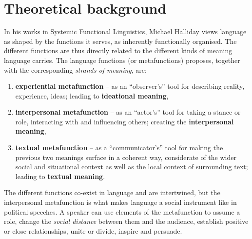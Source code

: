 \documentclass[11pt]{article}
\begin{document}
\section{Theoretical background}{
	In his works in Systemic Functional Linguistics, Michael Halliday views language as shaped by the functions it serves, as inherently functionally organised. The different functions are thus directly related to the different kinds of meaning language carries.
	The language functions (or metafunctions) \citet{Halliday1970IM} proposes, together with the corresponding \textit{strands of meaning}, are:
	\begin{enumerate}
		\item \textbf{experiential metafunction} -- as an ``observer's'' tool for describing reality, experience, ideas; leading to \textbf{ideational meaning},
		\item \textbf{interpersonal metafunction} -- as an ``actor's'' tool for taking a stance or role, interacting with and influencing others; creating the \textbf{interpersonal meaning},
		\item \textbf{textual metafunction} -- as a ``communicator's'' tool for making the previous two meanings surface in a coherent way, considerate of the wider social and situational context as well as the local context of surrounding text; leading to \textbf{textual meaning}.
	\end{enumerate}
	The different functions co-exist in language and are intertwined, but the interpersonal metafunction is what makes language a social instrument like in political speeches. A speaker can use elements of the metafunction to assume a role, change the \textit{social distance} between them and the audience, establish positive or close relationships, unite or divide, inspire and persuade.
}
\end{document}
